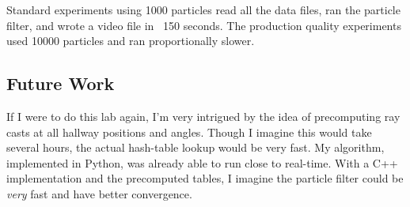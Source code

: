 \documentclass[11pt]{amsart}
\begin{document}
Standard experiments using 1000 particles read all the data files, ran the particle filter, and wrote a video file in ~150 seconds. The production quality experiments used 10000 particles and ran proportionally slower.

\subsection{Future Work}
If I were to do this lab again, I'm very intrigued by the idea of precomputing ray casts at all hallway positions and angles. Though I imagine this would take several hours, the actual hash-table lookup would be very fast. My algorithm, implemented in Python, was already able to run close to real-time. With a C++ implementation and the precomputed tables, I imagine the particle filter could be \emph{very} fast and have better convergence.

{}
 
\end{document}
